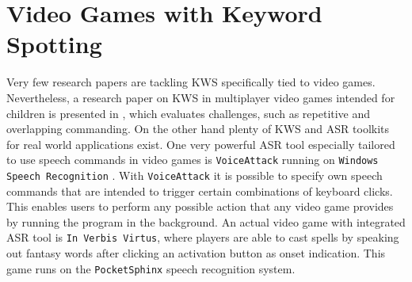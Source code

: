 
\section{Video Games with Keyword Spotting}\label{sec:prev_kws_games}
Very few research papers are tackling KWS specifically tied to video games.
Nevertheless, a research paper on KWS in multiplayer video games intended for children is presented in \cite{Harshavardhan2015}, which evaluates challenges, such as repetitive and overlapping commanding.
On the other hand plenty of KWS and ASR toolkits for real world applications exist.
One very powerful ASR tool especially tailored to use speech commands in video games is \texttt{VoiceAttack} running on \texttt{Windows Speech Recognition} \cite{Xiong2017SpeechRecSystem}.
With \texttt{VoiceAttack} it is possible to specify own speech commands that are intended to trigger certain combinations of keyboard clicks.
This enables users to perform any possible action that any video game provides by running the program in the background.
An actual video game with integrated ASR tool is \texttt{In Verbis Virtus}, where players are able to cast spells by speaking out fantasy words after clicking an activation button as onset indication.
This game runs on the \texttt{PocketSphinx} \cite{Huggins2006PocketSphinx} speech recognition system.